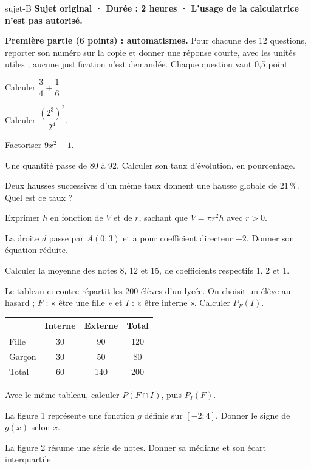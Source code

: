 \begin{blocEdition}{sujet-B}
\textbf{Sujet original · Durée : 2 heures · L’usage de la calculatrice n’est pas autorisé.}
\par\smallskip\textbf{Première partie (6 points) : automatismes.} Pour chacune des 12 questions,
reporter son numéro sur la copie et donner une réponse courte, avec les unités utiles ;
aucune justification n’est demandée. Chaque question vaut 0,5 point.
\par\vspace{2mm}\begin{questions}\item Calculer $\dfrac34+\dfrac16$.
\item Calculer $\dfrac{(2^3)^2}{2^4}$.
\item Factoriser $9x^2-1$.
\item Une quantité passe de 80 à 92. Calculer son taux d’évolution, en pourcentage.
\item Deux hausses successives d’un même taux donnent une hausse globale de $21\,\%$. Quel est ce taux ?
\item Exprimer $h$ en fonction de $V$ et de $r$, sachant que $V=\pi r^2h$ avec $r>0$.
\item La droite $d$ passe par $A(0;3)$ et a pour coefficient directeur $-2$. Donner son équation réduite.
\item Calculer la moyenne des notes 8, 12 et 15, de coefficients respectifs 1, 2 et 1.
\item \begin{minipage}[t]{86mm}Le tableau ci-contre répartit les 200 élèves d’un lycée. On choisit un élève au hasard ; $F$ : « être une fille » et $I$ : « être interne ». Calculer $P_F(I)$.\end{minipage}\hfill
\begin{minipage}[t]{62mm}\vspace{-3.2mm}\small\begin{tabular}[t]{@{}lccc@{}}\toprule
 & Interne & Externe & Total\\\midrule
Fille & 30 & 90 & 120\\
Garçon & 30 & 50 & 80\\
Total & 60 & 140 & 200\\\bottomrule
\end{tabular}\end{minipage}
\item Avec le même tableau, calculer $P(F\cap I)$, puis $P_I(F)$.
\item La figure 1 représente une fonction $g$ définie sur $[-2;4]$. Donner le signe de $g(x)$ selon $x$.
\item La figure 2 résume une série de notes. Donner sa médiane et son écart interquartile.\end{questions}
\label{figedition-sujet-B-1}
\end{blocEdition}

